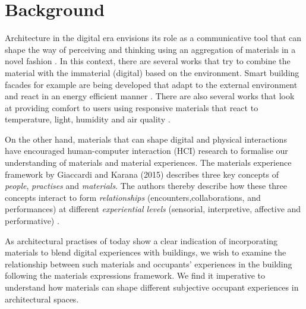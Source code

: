 \documentclass[manuscript, anonymous, review]{acmart}
\begin{document}
\section{Background}
Architecture in the digital era envisions its role as a communicative tool that can shape the way of perceiving and thinking using an aggregation of materials in a novel fashion \cite{kolarevic2001designing}. In this context, there are several works that try to combine the material with the immaterial (digital) based on the environment. Smart building facades for example are being developed that adapt to the external environment and react in an energy efficient manner \cite{ahmed2015development}. There are also several works that look at providing comfort to users using responsive materials that react to temperature, light, humidity and air quality \cite{fragkia2020exergy, holstov2015hygromorphic, kroner1997intelligent}. 

On the other hand, materials that can shape digital and physical interactions have encouraged human-computer interaction (HCI) research to formalise our understanding of materials and material experiences. The materials experience framework by Giaccardi and Karana (2015) describes three key concepts of \textit{people}, \textit{practises} and \textit{materials}. The authors thereby describe how these three concepts interact to form \textit{relationships}  (encounters,collaborations, and performances) at different \textit{experiential levels} (sensorial, interpretive, affective and performative) \cite{giaccardi2015foundations}. 

As architectural practises of today show a clear indication of incorporating materials to blend digital experiences with buildings, we wish to examine the relationship between such materials and occupants' experiences in the building following the materials expressions framework. We find it imperative to understand how materials can shape different subjective occupant experiences in architectural spaces.


\end{document}
